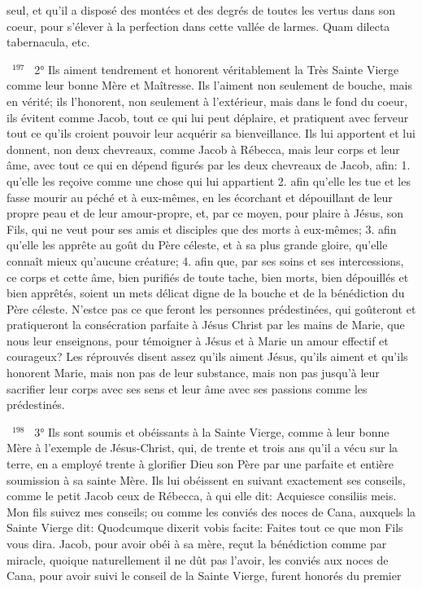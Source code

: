 \documentclass[paper=a5,pagesize=pdftex,fontsize=15pt,headinclude=on,twoside=off]{scrbook}
\newcommand{\negphantom}[1]{\settowidth{\dimen0}{#1}\hspace*{-\dimen0}}
\newcommand{\versenb}[1]{\par \vspace{10pt}~\negphantom{~${}^{#1}$~}${}^{#1}$~}
\begin{document}
seul, et qu'il a disposé des montées et des degrés de toutes les vertus dans son coeur, pour s'élever à la
perfection dans cette vallée de larmes. Quam dilecta tabernacula, etc.
\versenb{197} 2° Ils aiment tendrement et honorent véritablement la Très Sainte Vierge comme leur bonne Mère et
Maîtresse. Ils l'aiment non seulement de bouche, mais en vérité; ils l'honorent, non seulement à l'extérieur, mais
dans le fond du coeur, ils évitent comme Jacob, tout ce qui lui peut déplaire, et pratiquent avec ferveur tout ce
qu'ils croient pouvoir leur acquérir sa bienveillance. Ils lui apportent et lui donnent, non deux chevreaux, comme
Jacob à Rébecca, mais leur corps et leur âme, avec tout ce qui en dépend figurés par les deux chevreaux de
Jacob, afin: 1. qu'elle les reçoive comme une chose qui lui appartient 2. afin qu'elle les tue et les fasse mourir au
péché et à eux-mêmes, en les écorchant et dépouillant de leur propre peau et de leur amour-propre, et, par ce
moyen, pour plaire à Jésus, son Fils, qui ne veut pour ses amis et disciples que des morts à eux-mêmes; 3. afin
qu'elle les apprête au goût du Père céleste, et à sa plus grande gloire, qu'elle connaît mieux qu'aucune créature; 4.
afin que, par ses soins et ses intercessions, ce corps et cette âme, bien purifiés de toute tache, bien morts, bien
dépouillés et bien apprêtés, soient un mets délicat digne de la bouche et de la bénédiction du Père céleste. N'estce pas ce que feront les personnes prédestinées, qui goûteront et pratiqueront la consécration parfaite à Jésus Christ par les mains de Marie, que nous leur enseignons, pour témoigner à Jésus et à Marie un amour effectif et
courageux?
Les réprouvés disent assez qu'ils aiment Jésus, qu'ils aiment et qu'ils honorent Marie, mais non pas de leur
substance, mais non pas jusqu'à leur sacrifier leur corps avec ses sens et leur âme avec ses passions comme les
prédestinés.
\versenb{198} 3° Ils sont soumis et obéissants à la Sainte Vierge, comme à leur bonne Mère à l'exemple de Jésus-Christ,
qui, de trente et trois ans qu'il a vécu sur la terre, en a employé trente à glorifier Dieu son Père par une parfaite et
entière soumission à sa sainte Mère. Ils lui obéissent en suivant exactement ses conseils, comme le petit Jacob
ceux de Rébecca, à qui elle dit: Acquiesce consiliis meis. Mon fils suivez mes conseils; ou comme les conviés des
noces de Cana, auxquels la Sainte Vierge dit: Quodcumque dixerit vobis facite: Faites tout ce que mon Fils vous
dira. Jacob, pour avoir obéi à sa mère, reçut la bénédiction comme par miracle, quoique naturellement il ne dût pas
l'avoir, les conviés aux noces de Cana, pour avoir suivi le conseil de la Sainte Vierge, furent honorés du premier
\end{document}
